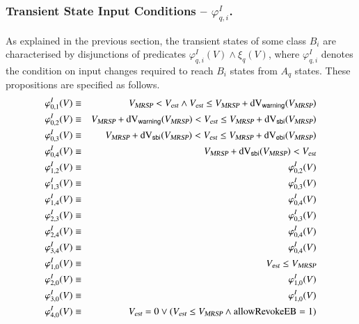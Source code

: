 \subsubsection{Transient State Input Conditions -- $\varphi_{q,i}^I$.}\label{sec:transientinputcond}
As explained in the previous section, the transient states of some class $B_i$ are characterised 
by disjunctions of  
predicates  $\varphi_{q,i}^I(V) \wedge \xi_q(V)$, where $\varphi_{q,i}^I$ denotes the condition on
input changes required to reach $B_i$ states from $A_q$ states. These propositions are specified as follows.
\footnotesize
\begin{eqnarray}
\label{eq:phiIa}
\varphi_{0,1}^I(V) &\equiv& {V_{\text{\sl MRSP}}} < {V_{\text{\sl est}}} \wedge {V_{\text{\sl est}}} \le {V_{\text{\sl MRSP}}} + \text{dV}_{\mathsf{warning}}({V_{\text{\sl MRSP}}})
\\
\varphi_{0,2}^I(V) &\equiv& {V_{\text{\sl MRSP}}} + \text{dV}_{\mathsf{warning}}({V_{\text{\sl MRSP}}}) < {V_{\text{\sl est}}}   \le {V_{\text{\sl MRSP}}} + \text{dV}_{\mathsf{sbi}}({V_{\text{\sl MRSP}}})  
\\
\varphi_{0,3}^I(V) &\equiv& {V_{\text{\sl MRSP}}} + \text{dV}_{\mathsf{sbi}}({V_{\text{\sl MRSP}}}) < {V_{\text{\sl est}}}   \le {V_{\text{\sl MRSP}}} + \text{dV}_{\mathsf{ebi}}({V_{\text{\sl MRSP}}})
\\
\varphi_{0,4}^I(V) &\equiv& {V_{\text{\sl MRSP}}} + \text{dV}_{\mathsf{sbi}}({V_{\text{\sl MRSP}}}) < {V_{\text{\sl est}}} 
\\
\varphi_{1,2}^I(V) &\equiv& \varphi_{0,2}^I(V)
\\  
\varphi_{1,3}^I(V) &\equiv& \varphi_{0,3}^I(V)
\\
\varphi_{1,4}^I(V) &\equiv& \varphi_{0,4}^I(V)
\\
\varphi_{2,3}^I(V) &\equiv& \varphi_{0,3}^I(V)
\\ 
\varphi_{2,4}^I(V) &\equiv& \varphi_{0,4}^I(V)
\\
\varphi_{3,4}^I(V) &\equiv& \varphi_{0,4}^I(V)
\\
\varphi_{1,0}^I(V) &\equiv& {V_{\text{\sl est}}} \le {V_{\text{\sl MRSP}}}  
\\
\varphi_{2,0}^I(V) &\equiv& \varphi_{1,0}^I(V)  
\\
\varphi_{3,0}^I(V) &\equiv& \varphi_{1,0}^I(V)  
\\
\label{eq:phiIz}
\varphi_{4,0}^I(V) &\equiv& {V_{\text{\sl est}}} = 0 \vee ({V_{\text{\sl est}}} \le {V_{\text{\sl MRSP}}} \wedge \text{allowRevokeEB} = 1)
\\
\end{eqnarray}
\normalsize

